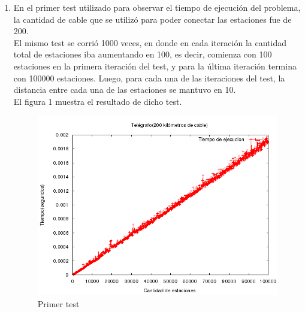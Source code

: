 \documentclass[10pt, a4paper]{article}
\begin{document}
\begin{enumerate}
	\item En el primer test utilizado para observar el tiempo de ejecuci\'on del problema, la cantidad de cable que se utiliz\'o para poder conectar las estaciones fue de 200.\\ El mismo test se corri\'o 1000 veces, en donde en cada iteraci\'on la cantidad total de estaciones iba aumentando en 100, es decir, comienza con 100 estaciones en la primera iteraci\'on del test, y para la \'ultima iteraci\'on termina con 100000 estaciones. Luego, para cada una de las iteraciones del test, la distancia entre cada una de las estaciones se mantuvo en 10.\\
	El figura 1 muestra el resultado de dicho test.\\
	\begin{figure}[H]
  		\centering
   	 	\includegraphics[width=1\textwidth]
   	 	{Imagenes/telegrafoTiempos1.png}
		\caption{Primer test}
	\end{figure}
	

\end{enumerate}
\end{document}
